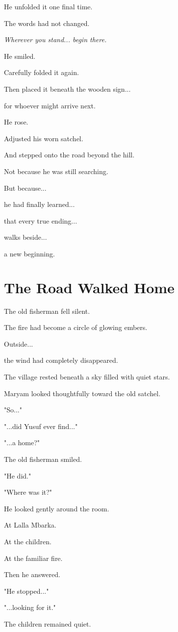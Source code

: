 \documentclass[12pt,openany]{book}
\begin{document}
He unfolded it one final time.

The words had not changed.

\emph{Wherever you stand... begin there.}

He smiled.

Carefully folded it again.

Then placed it beneath the wooden sign...

for whoever might arrive next.

He rose.

Adjusted his worn satchel.

And stepped onto the road beyond the hill.

Not because he was still searching.

But because...

he had finally learned...

that every true ending...

walks beside...

a new beginning.
\section*{The Road Walked Home}

The old fisherman fell silent.

The fire had become a circle of glowing embers.

Outside...

the wind had completely disappeared.

The village rested beneath a sky filled with quiet stars.

Maryam looked thoughtfully toward the old satchel.

"So..."

"...did Yusuf ever find..."

"...a home?"

The old fisherman smiled.

"He did."

"Where was it?"

He looked gently around the room.

At Lalla Mbarka.

At the children.

At the familiar fire.

Then he answered.

"He stopped..."

"...looking for it."

The children remained quiet.
\end{document}
